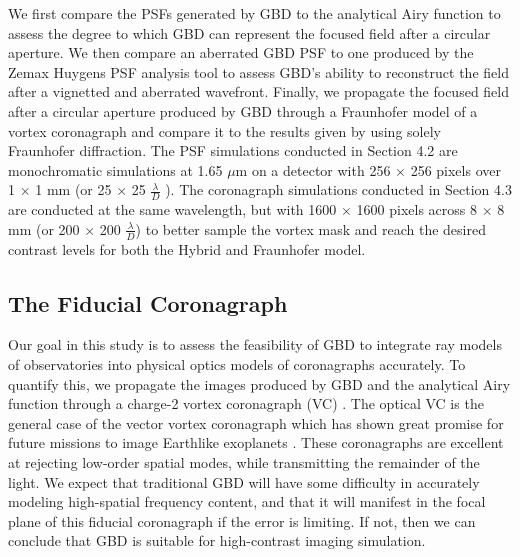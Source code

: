 We first compare the PSFs generated by GBD to the analytical Airy function to assess the degree to which GBD can represent the focused field after a circular aperture. We then compare an aberrated GBD PSF to one produced by the Zemax Huygens PSF analysis tool to assess GBD's ability to reconstruct the field after a vignetted and aberrated wavefront. Finally, we propagate the focused field after a circular aperture produced by GBD through a Fraunhofer model of a vortex coronagraph and compare it to the results given by using solely Fraunhofer diffraction. The PSF simulations conducted in Section 4.2 are monochromatic simulations at 1.65 $\mu$m on a detector with 256 $\times$ 256 pixels over 1 $\times$ 1 mm (or 25 $\times$ 25 $\frac{\lambda}{D}$ ). The coronagraph simulations conducted in Section 4.3 are conducted at the same wavelength, but with 1600 $\times$ 1600 pixels across 8 $\times$ 8 mm (or 200 $\times$ 200 $\frac{\lambda}{D}$) to better sample the vortex mask and reach the desired contrast levels for both the Hybrid and Fraunhofer model.

\subsection{The Fiducial Coronagraph}
Our goal in this study is to assess the feasibility of GBD to integrate ray models of observatories into physical optics models of coronagraphs accurately. To quantify this, we propagate the images produced by GBD and the analytical Airy function through a charge-2 vortex coronagraph (VC) \cite{mawet_annular_2005,lee_experimental_2006}. The optical VC is the general case of the vector vortex coronagraph\cite{mawet_vector_2010} which has shown great promise for future missions to image Earthlike exoplanets \cite{serabyn_vector_2019-1}. These coronagraphs are excellent at rejecting low-order spatial modes, while transmitting the remainder of the light. We expect that traditional GBD will have some difficulty in accurately modeling high-spatial frequency content, and that it will manifest in the focal plane of this fiducial coronagraph if the error is limiting. If not, then we can conclude that GBD is suitable for high-contrast imaging simulation.


